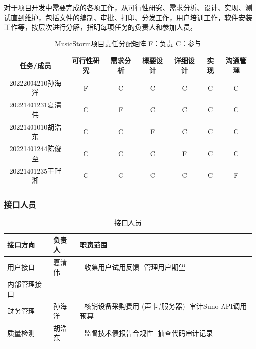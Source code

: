 \documentclass{base}
\begin{document}
对于项目开发中需要完成的各项工作，从可行性研究、需求分析、设计、实现、测试直到维护，包括文件的编制、审批、打印、分发工作，用户培训工作，软件安装工作等，按层次进行分解，指明每项任务的负责人和参加人员。

\begin{longtable}{@{}ccccccc@{}}
\caption{MusicStorm项目责任分配矩阵  F：负责  C：参与}
\label{tab:my-table}\\
\toprule
任务/成员           & 可行性研究 & 需求分析 & 概要设计 & 详细设计 & 实现 & 沟通管理 \\* \midrule
\endhead
%
\bottomrule
\endfoot
%
\endlastfoot
%
20222004210孙海洋 & F     & C    & C    & C    & C  & C    \\
20221401231夏清伟 & C     & F    & C    & C    & C  & C    \\
20221401010胡浩东 & C     & C    & F    & C    & C  & C    \\
20221401244陈俊至 & C     & C    & C    & F    & C  & C    \\
20221401235于畔湘 & C     & C    & C    & C    & C  & F    \\* \bottomrule
\end{longtable}

\subsubsection{接口人员}

\begin{longtable}{@{}lll@{}}
\caption{接口人员}
\label{tab:my-table}\\
\toprule
\textbf{接口方向} & \textbf{负责人} & \textbf{职责范围}                       \\* \midrule
\endhead
%
\bottomrule
\endfoot
%
\endlastfoot
%
用户接口          & 夏清伟          & - 收集用户试用反馈- 管理用户期望                  \\
内部管理接口        &              &                                     \\
财务管理          & 孙海洋          & - 核销设备采购费用 (声卡/服务器)- 审计Suno API调用预算 \\
质量检测          & 胡浩东          & - 监督技术债报告合规性- 抽查代码审计记录              \\* \bottomrule
\end{longtable}
\end{document}
